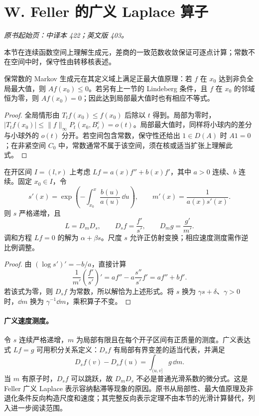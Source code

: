 \section{W. Feller 的广义 Laplace 算子}\label{sec:yosida-13-06}
\noindent\textit{原书起始页：中译本 422；英文版 403。}

本节在连续函数空间上理解生成元，差商的一致范数收敛保证可逐点计算；常数不在空间中时，保守性由转移核表述。

\begin{proposition}[最大值性质与局部性]\label{prop:y13-local-maximum}
保常数的 Markov 生成元在其定义域上满足正最大值原理：若 $f$ 在 $x_0$ 达到非负全局最大值，则 $Af(x_0)\le0$。若另有上一节的 Lindeberg 条件，且 $f$ 在 $x_0$ 的邻域恒为零，则 $Af(x_0)=0$；因此达到局部最大值时也有相应不等式。
\end{proposition}
\begin{proof}
全局情形由 $T_tf(x_0)\le f(x_0)$ 后除以 $t$ 得到。局部为零时，$|T_tf(x_0)|\le\|f\|_\infty P_t(x_0,B_\varepsilon^c)=o(t)$。局部最大值时，同样将小球内的差分与小球外的 $o(t)$ 分开。若空间包含常数，保守性还给出 $1\in D(A)$ 时 $A1=0$；在非紧空间 $C_0$ 中，常数通常不属于该空间，须在核或适当扩张上理解此式。
\end{proof}

\begin{theorem}[光滑系数的尺度与速度表示]\label{thm:y13-scale-speed}
在开区间 $I=(l,r)$ 上考虑 $Lf=a(x)f''+b(x)f'$，其中 $a>0$ 连续、$b$ 连续。固定 $x_0\in I$，令
\[
 s'(x)=\exp\left(-\int_{x_0}^x\frac{b(u)}{a(u)}\,\dd u\right),\qquad
 m'(x)=\frac1{a(x)s'(x)}.
\]
则 $s$ 严格递增，且
\[
 L=D_mD_s,\qquad D_sf=\frac{f'}{s'},\qquad D_mg=\frac{g'}{m'}.
\]
调和方程 $Lf=0$ 的解为 $\alpha+\beta s$。尺度 $s$ 允许正仿射变换；相应速度测度需作逆比例调整。
\end{theorem}
\begin{proof}
由 $(\log s')'=-b/a$，直接计算
\[
 \frac1{m'}\left(\frac{f'}{s'}\right)'
 =a f''-a\frac{s''}{s'}f'=a f''+bf'.
\]
若该式为零，则 $D_sf$ 为常数，所以解恰为上述形式。将 $s$ 换为 $\gamma s+\delta$、$\gamma>0$ 时，$\dd m$ 换为 $\gamma^{-1}\dd m$，乘积算子不变。
\end{proof}

\paragraph{广义速度测度。}
令 $s$ 连续严格递增，$m$ 为局部有限且在每个开子区间有正质量的测度。广义表达式 $Lf=g$ 可用积分关系定义：$D_sf$ 有局部有界变差的适当代表，并满足
\[
 D_sf(v)-D_sf(u)=\int_{(u,v]}g\,\dd m.
\]
当 $m$ 有原子时，$D_sf$ 可以跳跃，故 $D_mD_s$ 不必是普通光滑系数的微分式。这是 Feller 广义 Laplace 表示容纳黏滞等现象的原因。原书从局部性、最大值原理及非退化条件反向构造尺度和速度；其完整反向表示定理不由本节的光滑计算替代，列入进一步阅读范围。

